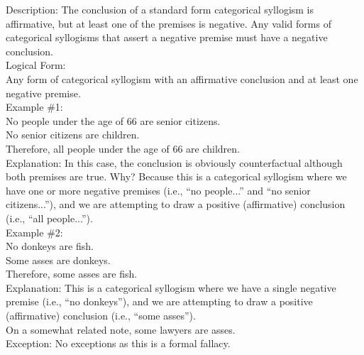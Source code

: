 \documentclass[a4paper,12pt,single,pdftex]{scrartcl}
\begin{document}
    
      Description: The conclusion of a standard form categorical syllogism is affirmative, but at least one of the premises is negative. Any valid forms of categorical syllogisms that assert a negative premise must have a negative conclusion.
    \\

    
      Logical Form:
    \\

    
      Any form of categorical syllogism with an affirmative conclusion and at least one negative premise.
    \\

    
      Example \#1:
    \\

    
      No people under the age of 66 are senior citizens.
    \\

    
      No senior citizens are children.
    \\

    
      Therefore, all people under the age of 66 are children.
    \\

    
      Explanation: In this case, the conclusion is obviously counterfactual although both premises are true.  Why?  Because this is a categorical syllogism where we have one or more negative premises (i.e., “no people...” and “no senior citizens...”), and we are attempting to draw a positive (affirmative) conclusion (i.e., “all people...”). 
    \\

    
      Example \#2:
    \\

    
      No donkeys are fish.
    \\

    
      Some asses are donkeys.
    \\

    
      Therefore, some asses are fish.
    \\

    
      Explanation: This is a categorical syllogism where we have a single negative premise (i.e., “no donkeys”), and we are attempting to draw a positive (affirmative) conclusion (i.e., “some asses”).
    \\

    
      On a somewhat related note, some lawyers are asses.
    \\

    
      Exception: No exceptions as this is a formal fallacy.
    \\
\end{document}
